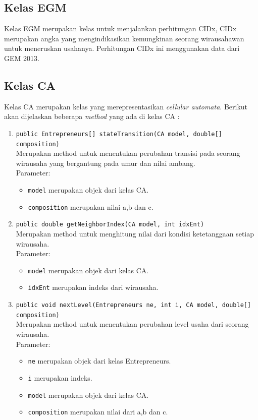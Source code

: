 \subsection{Kelas EGM}
	Kelas EGM merupakan kelas untuk menjalankan perhitungan CIDx, CIDx merupakan angka yang mengindikasikan kemungkinan seorang wirausahawan untuk meneruskan usahanya. Perhitungan CIDx ini menggunakan data dari GEM 2013.
	
\subsection{Kelas CA} 
Kelas CA merupakan kelas yang merepresentasikan \textit{cellular automata}. Berikut akan dijelaskan beberapa \textit{method} yang ada di kelas CA :
		\begin{enumerate}
			\item \texttt{public Entrepreneurs[] stateTransition(CA model, double[] composition)}\\
			Merupakan method untuk menentukan perubahan transisi pada seorang wirausaha yang bergantung pada umur dan nilai ambang.\\			Parameter:
			\begin{itemize}
				\item \texttt{model} merupakan objek dari kelas CA.
				\item \texttt{composition} merupakan nilai a,b dan c.
			\end{itemize}
			
			\item \texttt{public double getNeighborIndex(CA model, int idxEnt)}\\
			Merupakan method untuk menghitung nilai dari kondisi ketetanggaan setiap wirausaha.\\
			Parameter:
			\begin{itemize}
				\item \texttt{model} merupakan objek dari kelas CA.
				\item \texttt{idxEnt} merupakan indeks dari wirausaha.
			\end{itemize}
		
			\item \texttt{public void nextLevel(Entrepreneurs ne, int i, CA model, double[] composition)}\\
			Merupakan method untuk menentukan perubahan level usaha dari seorang wirausaha.\\
			Parameter:
			\begin{itemize}
				\item \texttt{ne} merupakan objek dari kelas Entrepreneurs.
				\item \texttt{i} merupakan indeks.
				\item \texttt{model} merupakan objek dari kelas CA.
				\item \texttt{composition} merupakan nilai dari a,b dan c.
			\end{itemize}
			

\end{enumerate}
